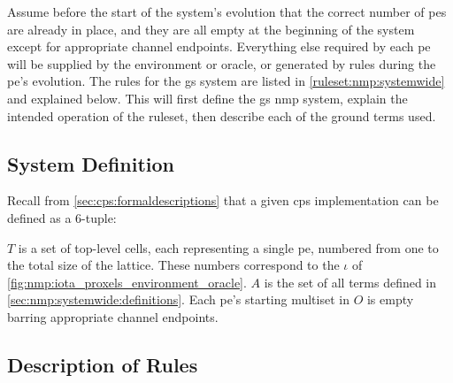 Assume before the start of the system's evolution that the correct number of \glspl{pe} are already in place, and they are all empty at the beginning of the system except for appropriate channel endpoints.  Everything else required by each \gls{pe} will be supplied by the environment or oracle, or generated by rules during the \gls{pe}'s evolution.  The rules for the \gls{gs} system are listed in \cref{ruleset:nmp:systemwide} and explained below.  This  will first define the \gls{gs} \gls{nmp} system, explain the intended operation of the \gls{ruleset}, then describe each of the ground terms used.

\subsection{System Definition}
Recall from \cref{sec:cps:formaldescriptions} that a given \gls{cps} implementation can be defined as a 6-tuple:


\(T\) is a set of top-level cells, each representing a single \gls{pe}, numbered from one to the total size of the lattice.  These numbers correspond to the \(\iota\) of \cref{fig:nmp:iota_proxels_environment_oracle}.  \(A\) is the set of all terms defined in \cref{sec:nmp:systemwide:definitions}.  Each \gls{pe}'s starting multiset in \(O\) is empty barring appropriate channel endpoints.

\subsection{\label{sec:nmp:systemwide:rulesdesc}Description of Rules}

